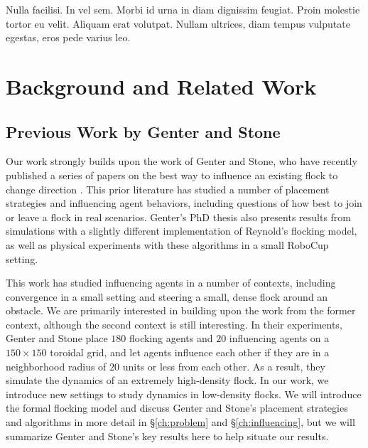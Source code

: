 \begin{savequote}[75mm]
Nulla facilisi. In vel sem. Morbi id urna in diam dignissim feugiat. Proin molestie tortor eu velit. Aliquam erat volutpat. Nullam ultrices, diam tempus vulputate egestas, eros pede varius leo.
\end{savequote}

\chapter{Background and Related Work}
\label{ch:background}


\section{Previous Work by Genter and Stone}
Our work strongly builds upon the work of Genter and Stone, who have recently
published a series of papers on the best way to influence an existing flock to
change direction \cite{genter2015placement, genter2014neighborsorientherd,
genter2013visionstationary, genter2013backsearch,
genter2016facegoalfacecurrent, genter201612steplookahead}.
This prior literature has studied a number of placement strategies and
influencing agent behaviors, including questions of how best to join or leave
a flock in real scenarios.
Genter's PhD thesis also presents results from simulations with a slightly
different implementation of Reynold's flocking model, as well as physical
experiments with these algorithms in a small RoboCup setting.

This work has studied influencing agents in a number of contexts, including
convergence in a small setting and steering a small, dense flock around an
obstacle.
We are primarily interested in building upon the work from the former context,
although the second context is still interesting.
In their experiments, Genter and Stone place $180$ flocking agents and $20$
influencing agents on a $150\times150$ toroidal grid, and let agents influence
each other if they are in a neighborhood radius of $20$ units or less from each
other.
As a result, they simulate the dynamics of an extremely high-density flock.
In our work, we introduce new settings to study dynamics in low-density flocks.
We will introduce the formal flocking model and discuss Genter and Stone's
placement strategies and algorithms in more detail in \S\ref{ch:problem} and
\S\ref{ch:influencing}, but we will summarize Genter and Stone's key results
here to help situate our results.

